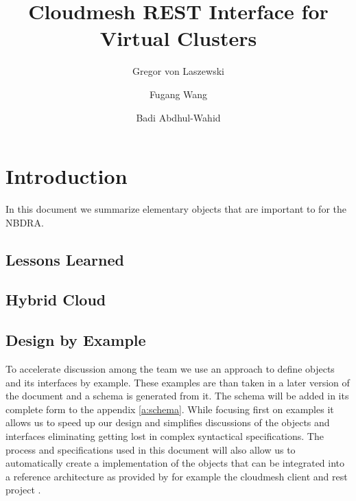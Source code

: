 \documentclass[9pt,twocolumn,twoside]{styles/osajnl}
\title{Cloudmesh REST Interface for Virtual Clusters}
\author[1,*]{Gregor von Laszewski}
\author[1]{Fugang Wang}
\author[1]{Badi Abdhul-Wahid}
\affil[1]{School of Informatics and Computing, Bloomington, IN 47408, U.S.A.}
\affil[*]{Corresponding authors: laszewski@gmal.com}
\begin{document}
\flushbottom %

\maketitle %

\tableofcontents %
\maketitle

\section{Introduction}

In this document we summarize elementary objects that are important to
for the NBDRA.

\subsection{Lessons Learned}


\subsection{Hybrid Cloud}


\subsection{Design by Example}

To accelerate discussion among the team we use an approach to define
objects and its interfaces by example. These examples are than taken
in a later version of the document and a schema is generated from
it. The schema will be added in its complete form to the appendix
\ref{a:schema}. While focusing first on examples it allows us to speed
up our design and simplifies discussions of the objects and interfaces
eliminating getting lost in complex syntactical specifications. The
process and specifications used in this document will also allow us to
automatically create a implementation of the objects that can be
integrated into a reference architecture as provided by for example
the cloudmesh client and rest project \cite{??}.
\end{document}
